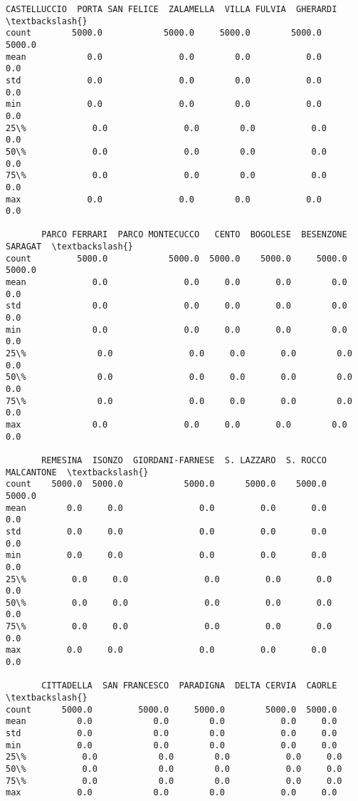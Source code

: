 \documentclass[11pt]{article}
\makeatletter
\newcommand{\boxspacing}{\kern\kvtcb@left@rule\kern\kvtcb@boxsep}
\newcommand{\prompt}[4]{
        {\ttfamily\llap{{\color{#2}[#3]:\hspace{3pt}#4}}\vspace{-\baselineskip}}
    }
\makeatother
\begin{document}
            \begin{tcolorbox}[breakable, size=fbox, boxrule=.5pt, pad at break*=1mm, opacityfill=0]
\prompt{Out}{outcolor}{27}{\boxspacing}
\begin{Verbatim}[commandchars=\\\{\}]
       CASTELLUCCIO  PORTA SAN FELICE  ZALAMELLA  VILLA FULVIA  GHERARDI  \textbackslash{}
count        5000.0            5000.0     5000.0        5000.0    5000.0
mean            0.0               0.0        0.0           0.0       0.0
std             0.0               0.0        0.0           0.0       0.0
min             0.0               0.0        0.0           0.0       0.0
25\%             0.0               0.0        0.0           0.0       0.0
50\%             0.0               0.0        0.0           0.0       0.0
75\%             0.0               0.0        0.0           0.0       0.0
max             0.0               0.0        0.0           0.0       0.0

       PARCO FERRARI  PARCO MONTECUCCO   CENTO  BOGOLESE  BESENZONE  SARAGAT  \textbackslash{}
count         5000.0            5000.0  5000.0    5000.0     5000.0   5000.0
mean             0.0               0.0     0.0       0.0        0.0      0.0
std              0.0               0.0     0.0       0.0        0.0      0.0
min              0.0               0.0     0.0       0.0        0.0      0.0
25\%              0.0               0.0     0.0       0.0        0.0      0.0
50\%              0.0               0.0     0.0       0.0        0.0      0.0
75\%              0.0               0.0     0.0       0.0        0.0      0.0
max              0.0               0.0     0.0       0.0        0.0      0.0

       REMESINA  ISONZO  GIORDANI-FARNESE  S. LAZZARO  S. ROCCO  MALCANTONE  \textbackslash{}
count    5000.0  5000.0            5000.0      5000.0    5000.0      5000.0
mean        0.0     0.0               0.0         0.0       0.0         0.0
std         0.0     0.0               0.0         0.0       0.0         0.0
min         0.0     0.0               0.0         0.0       0.0         0.0
25\%         0.0     0.0               0.0         0.0       0.0         0.0
50\%         0.0     0.0               0.0         0.0       0.0         0.0
75\%         0.0     0.0               0.0         0.0       0.0         0.0
max         0.0     0.0               0.0         0.0       0.0         0.0

       CITTADELLA  SAN FRANCESCO  PARADIGNA  DELTA CERVIA  CAORLE  \textbackslash{}
count      5000.0         5000.0     5000.0        5000.0  5000.0
mean          0.0            0.0        0.0           0.0     0.0
std           0.0            0.0        0.0           0.0     0.0
min           0.0            0.0        0.0           0.0     0.0
25\%           0.0            0.0        0.0           0.0     0.0
50\%           0.0            0.0        0.0           0.0     0.0
75\%           0.0            0.0        0.0           0.0     0.0
max           0.0            0.0        0.0           0.0     0.0


\end{Verbatim}
\end{tcolorbox}
\end{document}
